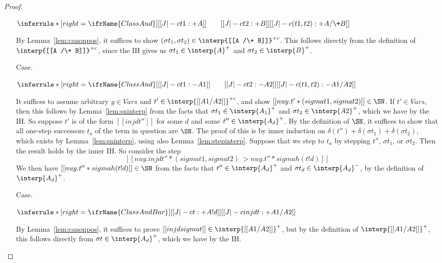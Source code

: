 \begin{proof}
\begin{itemize}
\vspace{-.2cm}
\begin{center}
\begin{math}
\inferrule* [right=\ifrName{ClassAnd}] {[[J |-c t1 : + A]] \qquad [[J |-c t2 : + B]]}{[[J |-c (t1,t2) : + A /\+ B]]}
\end{math}
\end{center}

By Lemma~\ref{lem:canonpos}, it suffices to show $(\sigma t_1,\sigma
t_2)\in\interp{[[A /\+ B]]}^{+c}$.  This follows directly from the
definition of $\interp{[[A /\+ B]]}^{+c}$, since the IH gives us
$\sigma t_1\in\interp{A}^+$ and $\sigma t_2\in\interp{B}^+$.

\item[Case.]\ 

\vspace{-.2cm}
\begin{center}
\begin{math}
\inferrule* [right=\ifrName{ClassAnd}] {[[J |-c t1 : - A1]] \qquad [[J |-c t2 : - A2]]}{[[J |-c (t1,t2) : - A1 /\- A2]]}
\end{math}
\end{center}

It suffices to assume arbitrary $y\in\textit{Vars}$ and
$t'\in\interp{[[A1 /\- A2]]}^{+c}$, and show $[[nu y . t' * (sigma t1
, sigma t2)]]\in\SN$.  If $t'\in\textit{Vars}$, then this follows by
Lemma~\ref{lem:sninterp} from the facts that $\sigma
t_1\in\interp{A_1}^+$ and $\sigma t_2\in\interp{A2}^+$, which we have
by the IH.  So suppose $t'$ is of the form $[[inj d t'']]$ for some
$d$ and some $t''\in\interp{A_d}^+$.  By the definition of $\SN$, it
suffices to show that all one-step successors $t_a$ of the term in
question are $\SN$.  The proof of this is by inner induction on
$\delta(t'') + \delta(\sigma t_1) + \delta(\sigma t_2)$, which exists
by Lemma~\ref{lem:sninterp}, using also Lemma~\ref{lem:stepinterp}.
Suppose that we step to $t_a$ by stepping $t''$, $\sigma t_1$, or
$\sigma t_2$.  Then the result holds by the inner IH.  So consider the
step
\[
[[nu y . inj d t'' * (sigma t1, sigma t2) ~> nu y . t'' * sigma h(t ! d)]]
\]
We then have $[[nu y . t'' * sigma h(t ! d)]]\in\SN$ from the facts
that $t''\in\interp{A_d}^+$ and $\sigma t_d\in\interp{A_d}^-$, by
the definition of $\interp{A_d}^+$.

\item[Case.]\ 

\vspace{-.2cm}
\begin{center}
\begin{math}
\inferrule* [right=\ifrName{ClassAndBar}] {[[J |-c t : + A ! d]]}{[[J |-c inj d t : + A1 /\- A2]]}
\end{math}
\end{center}
By Lemma~\ref{lem:canonpos}, it suffices to prove $[[inj d sigma
t]]\in\interp{[[ A1 /\- A2]]}^+$, but by the definition of $\interp{[[
  A1 /\- A2]]}^+$, this follows directly from $\sigma
t\in\interp{A_d}^+$, which we have by the IH.


\end{itemize}
\end{proof}
